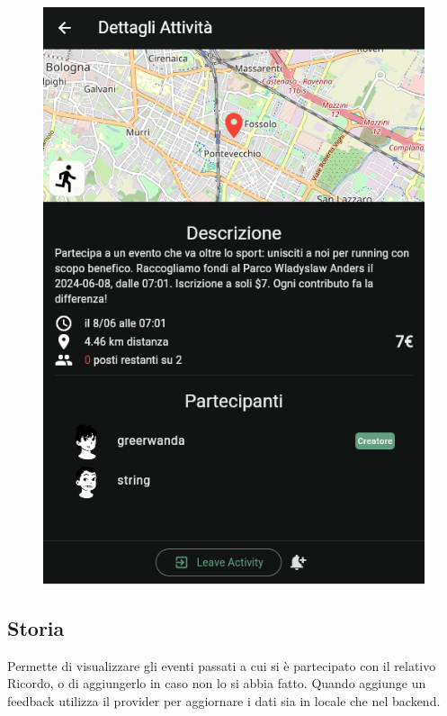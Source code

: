 \documentclass[a4paper,12pt]{article}
\begin{document}
\begin{figure}[H]
\begin{minipage}{0.32\textwidth}
        \includegraphics[width=1\linewidth]{img/joined.png}
    \end{minipage}
\end{figure}

\subsection{Storia}

Permette di visualizzare gli eventi passati a cui si è partecipato con il relativo Ricordo, o di aggiungerlo in caso non lo si abbia fatto. 
Quando aggiunge un feedback utilizza il provider per aggiornare i dati sia in locale che nel backend.
\end{document}
